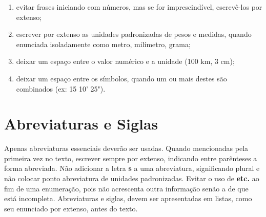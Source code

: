 \documentclass[repeatfields,xlists,xpacks,oneside,yearsonly]{ufrgscca}
\begin{document}
\begin{annex}
\begin{enumerate}
            \item evitar frases iniciando com números, mas se for imprescindível,
            escrevê-los por extenso;

            \item escrever por extenso as unidades padronizadas de pesos e medidas,
            quando enunciada isoladamente como metro, milímetro, grama;

            \item deixar um espaço entre o valor numérico e a unidade (100 km, 3 cm);

            \item deixar um espaço entre os símbolos, quando um ou mais destes são
            combinados (ex: 15  10' 25").

        \end{enumerate}

        \section{Abreviaturas e Siglas}

        Apenas abreviaturas essenciais deverão ser usadas. Quando mencionadas pela
        primeira vez no texto, escrever sempre por extenso, indicando entre
        parênteses a forma abreviada. Não adicionar a letra {\bf s} a uma abreviatura,
        significando plural e não colocar ponto abreviatura de unidades
        padronizadas. Evitar o uso de {\bf etc.} ao fim de uma enumeração, pois não
        acrescenta outra informação senão a de que está incompleta. Abreviaturas e
        siglas, devem ser apresentadas em listas, como seu enunciado por extenso,
        antes do texto.

    \end{annex}
\end{document}
